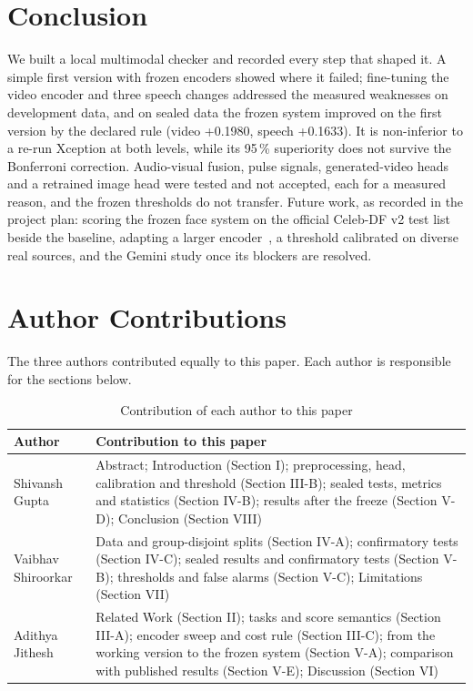 \documentclass[conference,a4paper]{IEEEtran_nodash}
\begin{document}
\section{Conclusion}\label{sec:concl}
We built a local multimodal checker and recorded every step that shaped it. A
simple first version with frozen encoders showed where it failed; fine-tuning the
video encoder and three speech changes addressed the measured weaknesses on
development data, and on sealed data the frozen system improved on the first
version by the declared rule (video +0.1980, speech +0.1633). It is non-inferior
to a re-run Xception at both levels, while its 95\,\% superiority does not survive
the Bonferroni correction. Audio-visual fusion, pulse signals, generated-video
heads and a retrained image head were tested and not accepted, each for a measured
reason, and the frozen thresholds do not transfer. Future work, as recorded in the
project plan: scoring the frozen face system on the official Celeb-DF v2 test list
beside the baseline, adapting a larger encoder~\cite{hu2022lora}, a threshold
calibrated on diverse real sources, and the Gemini study once its blockers are
resolved.

\section*{Author Contributions}
The three authors contributed equally to this paper. Each author is responsible for the sections below.
\begin{table}[h]
\centering
\caption{Contribution of each author to this paper}
\label{tab:contrib}
\footnotesize
\renewcommand{\arraystretch}{1.15}
\begin{tabular}{@{}L{1.7cm}L{6.5cm}@{}}
\toprule
Author & Contribution to this paper \\
\midrule
Shivansh Gupta & Abstract; Introduction (Section I); preprocessing, head, calibration and threshold (Section III-B); sealed tests, metrics and statistics (Section IV-B); results after the freeze (Section V-D); Conclusion (Section VIII) \\
Vaibhav Shiroorkar & Data and group-disjoint splits (Section IV-A); confirmatory tests (Section IV-C); sealed results and confirmatory tests (Section V-B); thresholds and false alarms (Section V-C); Limitations (Section VII) \\
Adithya Jithesh & Related Work (Section II); tasks and score semantics (Section III-A); encoder sweep and cost rule (Section III-C); from the working version to the frozen system (Section V-A); comparison with published results (Section V-E); Discussion (Section VI) \\
\bottomrule
\end{tabular}
\end{table}



\end{document}

